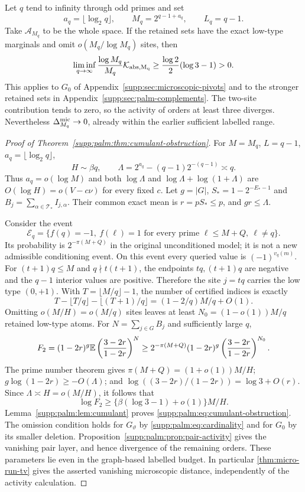 \begin{theorem}\label{supp:palm:thm:cumulant-obstruction}
Let $q$ tend to infinity through odd primes and set
\[
 a_q=\lfloor\log_2q\rfloor,\qquad M_q=2^{q-1+a_q},\qquad L_q=q-1.
\]
Take $\mathcal A_{M_q}$ to be the whole space. If the retained sets have the exact low-type marginals and omit $o(M_q/\log M_q)$ sites, then
\begin{equation}\label{supp:palm:eq:cumulant-obstruction}
 \liminf_{q\to\infty}\frac{\log M_q}{M_q}\mathcal K_{\rm abs,M_q}
 \ge\frac{\log2}{2}(\log3-1)>0.
\end{equation}
This applies to $G_0$ of Appendix~\ref{supp:sec:microscopic-pivots} and to the stronger retained sets in Appendix~\ref{supp:sec:palm-complements}. The two-site contribution tends to zero, so the activity of orders at least three diverges. Nevertheless $\Delta_{M_q}^{\rm mic}\to0$, already within the earlier sufficient labelled range.
\end{theorem}
\begin{proof}[Proof of Theorem~\ref{supp:palm:thm:cumulant-obstruction}]
For $M=M_q$, $L=q-1$, $a_q=\lfloor\log_2q\rfloor$,
\[
 H\sim\beta q,\qquad
 \Lambda=2^{a_q}-(q-1)2^{-(q-1)}\asymp q.
\]
Thus $a_q=o(\log M)$ and both $\log\Lambda$ and
$\log\Lambda+\log(1+\Lambda)$ are $O(\log H)=o(V-c\nu)$ for every fixed $c$.
Let $g=|G|$, $S_*=1-2^{-E_*-1}$ and
$B_j=\sum_{\alpha\in\mathcal T_*}I_{j,\alpha}$.
Their common exact mean is $r=pS_*\le p$, and $gr\le\Lambda$.

Consider the event
\[
 \mathcal E_q=\{f(q)=-1,\ f(\ell)=1
              \text{ for every prime }\ell\le M+Q,\ \ell\ne q\}.
\]
Its probability is $2^{-\pi(M+Q)}$ in the original unconditioned model; it is not a new admissible conditioning event. On this event every queried value is $(-1)^{v_q(m)}$.
For $(t+1)q\le M$ and $q\nmid t(t+1)$, the endpoints $tq,(t+1)q$ are negative and the $q-1$ interior values are positive. Therefore the site $j=tq$ carries the low type $(0,+1)$.
With $T=\lfloor M/q\rfloor-1$, the number of certified indices is exactly
\[
 T-\lfloor T/q\rfloor-\lfloor(T+1)/q\rfloor
       =(1-2/q)M/q+O(1).
\]
Omitting $o(M/H)=o(M/q)$ sites leaves at least
$N_0=(1-o(1))M/q$ retained low-type atoms.
For $N=\sum_{j\in G}B_j$ and sufficiently large $q$,
\[
 F_2=(1-2r)^g\mathbb E\left(\frac{3-2r}{1-2r}\right)^N
 \ge 2^{-\pi(M+Q)}(1-2r)^g
                   \left(\frac{3-2r}{1-2r}\right)^{N_0}.
\]
The prime number theorem gives $\pi(M+Q)=(1+o(1))M/H$;
$g\log(1-2r)\ge-O(\Lambda)$; and
$\log((3-2r)/(1-2r))=\log3+O(r)$.
Since $\Lambda\asymp H=o(M/H)$, it follows that
\[
 \log F_2\ge\{\beta(\log3-1)+o(1)\}M/H.
\]
Lemma~\ref{supp:palm:lem:cumulant} proves \eqref{supp:palm:eq:cumulant-obstruction}.
The omission condition holds for $G_\vartheta$ by \eqref{supp:palm:eq:cardinality} and for $G_0$ by its smaller deletion. Proposition~\ref{supp:palm:prop:pair-activity} gives the vanishing pair layer, and hence divergence of the remaining orders. These parameters lie even in the graph-based labelled budget. In particular \cref{thm:micro-run-tv} gives the asserted vanishing microscopic distance, independently of the activity calculation.
\end{proof}
